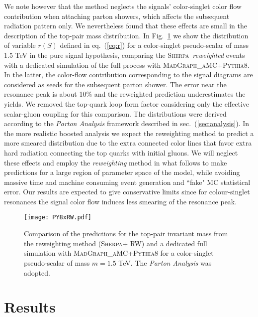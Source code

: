 \documentclass[aps,prd,amsmath,amssymb,superscriptaddress, preprintnumbers,preprint,nofootinbib,a4paper]{revtex4}
\makeatletter
\def\Sherpa{\textsc{Sherpa}}
\def\mg5{\textsc{MadGraph\_aMC\@NLO}}
\def\eq#1{{eq.~(\ref{#1})}}
\def\sec#1{{sec.~(\ref{#1})}}
\makeatother
\begin{document}
We note however that the method neglects the signals' color-singlet
color flow contribution when attaching parton showers, which affects the subsequent radiation pattern only. 
We nevertheless found that these effects are small in the description of the top-pair mass distribution.
In Fig.~\ref{fig:rwgtXfull} we show the distribution of variable $r(S)$ defined in \eq{eq:r} for a color-singlet
pseudo-scalar of mass $1.5$ TeV in the pure signal hypothesis, comparing the \Sherpa ~\emph{reweighted} events with a dedicated simulation of the full
process with \mg5+\textsc{Pythia}8. 
In the latter, the color-flow contribution corresponding to the signal diagrams are considered as
seeds for the subsequent parton shower. The error near the resonance peak is
about 10\% and the reweighted prediction underestimates the yields. 
We removed the top-quark loop form factor considering only the effective scalar-gluon coupling for this
comparison. The distributions were derived according to the \emph{Parton Analysis} framework
described in \sec{sec:analysis}. In the more realistic boosted analysis we expect the reweighting
method to predict a more smeared distribution due to the extra connected color lines that favor
extra hard radiation connecting the top quarks with initial gluons.  We will neglect these effects and employ the \emph{reweighting}
method in what follows to make predictions for a large region of parameter space of the model, while avoiding massive
time and machine consuming event generation and ``fake" MC statistical error. 
Our results are expected to give conservative limits since for colour-singlet resonances the signal color flow induces
less smearing of the resonance peak.

\begin{figure}
\texttt{[image: PY8xRW.pdf]}
\caption{Comparison of the predictions for the top-pair invariant mass from the reweighting method (\Sherpa + RW) and
  a dedicated full simulation with \mg5+\textsc{Pythia}8 for a color-singlet pseudo-scalar of mass $m=1.5$ TeV. The \emph{Parton Analysis} was adopted.}
\label{fig:rwgtXfull}
\end{figure} 

\section{Results}
\label{sec:statistics}
\end{document}
